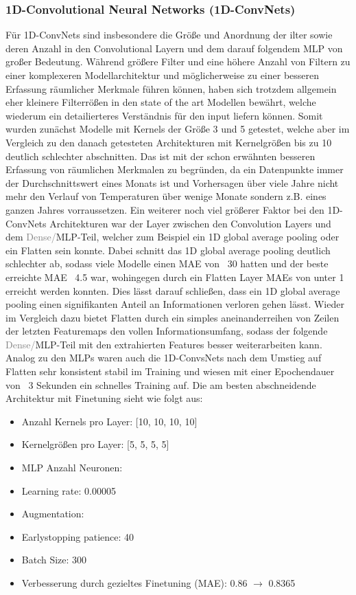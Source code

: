 \documentclass[manuscript,screen,review]{acmart} %
\begin{document}
\subsubsection*{1D-Convolutional Neural Networks (1D-ConvNets)}
Für 1D-ConvNets sind insbesondere die Größe und Anordnung der ilter sowie deren Anzahl in den Convolutional Layern und dem darauf folgendem MLP von großer Bedeutung. 
Während größere Filter und eine höhere Anzahl von Filtern zu einer komplexeren Modellarchitektur und möglicherweise zu einer besseren Erfassung räumlicher Merkmale führen können, haben sich trotzdem allgemein eher kleinere Filterrößen in den state of the art Modellen bewährt, welche wiederum ein detailierteres Verständnis für den input liefern können.
Somit wurden zunächst Modelle mit Kernels der Größe 3 und 5 getestet, welche aber im Vergleich zu den danach getesteten Architekturen mit Kernelgrößen bis zu 10 deutlich schlechter abschnitten. Das ist mit der schon erwähnten besseren Erfassung von räumlichen Merkmalen zu begründen, da ein Datenpunkte immer der Durchschnittswert eines Monats ist und Vorhersagen über viele Jahre nicht mehr den Verlauf von Temperaturen über wenige Monate sondern z.B. eines ganzen Jahres vorraussetzen.
Ein weiterer noch viel größerer Faktor bei den 1D-ConvNets Architekturen war der Layer zwischen den Convolution Layers und dem \textcolor{gray}{Dense/}MLP-Teil, welcher zum Beispiel ein 1D global average pooling oder ein Flatten sein konnte. Dabei schnitt das 1D global average pooling deutlich schlechter ab, sodass viele Modelle einen MAE von ~30 hatten und der beste erreichte MAE ~4.5 war, wohingegen durch ein Flatten Layer MAEs von unter 1 erreicht werden konnten. Dies lässt darauf schließen, dass ein 1D global average pooling einen signifikanten Anteil an Informationen verloren gehen lässt. Wieder im Vergleich dazu bietet Flatten durch ein simples aneinanderreihen von Zeilen der letzten Featuremaps den vollen Informationsumfang, sodass der folgende \textcolor{gray}{Dense/}MLP-Teil mit den extrahierten Features besser weiterarbeiten kann.
 Analog zu den MLPs waren auch die 1D-ConvsNets nach dem Umstieg auf Flatten sehr konsistent stabil im Training und wiesen mit einer Epochendauer von ~3 Sekunden ein schnelles Training auf. 
Die am besten abschneidende Architektur mit Finetuning sieht wie folgt aus:
\begin{itemize}
    \item Anzahl Kernels pro Layer: [10, 10, 10, 10]
    \item Kernelgrößen pro Layer: [5, 5, 5, 5]
    \item MLP Anzahl Neuronen: 
    \item Learning rate: 0.00005
    \item Augmentation: 
    \item Earlystopping patience: 40
    \item Batch Size: 300
    \item Verbesserung durch gezieltes Finetuning (MAE): 0.86 $\rightarrow$ 0.8365
\end{itemize}
\end{document}
